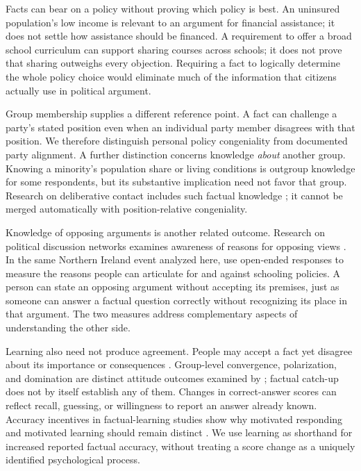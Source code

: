 \documentclass[11pt]{article}
\begin{document}
Facts can bear on a policy without proving which policy is best. An uninsured population's low income is relevant to an argument for financial assistance; it does not settle how assistance should be financed. A requirement to offer a broad school curriculum can support sharing courses across schools; it does not prove that sharing outweighs every objection. Requiring a fact to logically determine the whole policy choice would eliminate much of the information that citizens actually use in political argument.

Group membership supplies a different reference point. A fact can challenge a party's stated position even when an individual party member disagrees with that position. We therefore distinguish personal policy congeniality from documented party alignment. A further distinction concerns knowledge \emph{about} another group. Knowing a minority's population share or living conditions is outgroup knowledge for some respondents, but its substantive implication need not favor that group. Research on deliberative contact includes such factual knowledge \citep{kim2018}; it cannot be merged automatically with position-relative congeniality.

Knowledge of opposing arguments is another related outcome. Research on political discussion networks examines awareness of reasons for opposing views \citep{mutz2002cross}. In the same Northern Ireland event analyzed here, \citet{sood2026arguments} use open-ended responses to measure the reasons people can articulate for and against schooling policies. A person can state an opposing argument without accepting its premises, just as someone can answer a factual question correctly without recognizing its place in that argument. The two measures address complementary aspects of understanding the other side.

Learning also need not produce agreement. People may accept a fact yet disagree about its importance or consequences \citep{gaines2007}. Group-level convergence, polarization, and domination are distinct attitude outcomes examined by \citet{luskin2022distortions}; factual catch-up does not by itself establish any of them. Changes in correct-answer scores can reflect recall, guessing, or willingness to report an answer already known. Accuracy incentives in factual-learning studies show why motivated responding and motivated learning should remain distinct \citep{khanna2018}. We use learning as shorthand for increased reported factual accuracy, without treating a score change as a uniquely identified psychological process.
\end{document}
